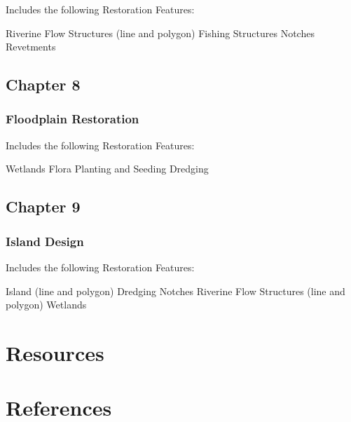\documentclass[
  letterpaper,
  DIV=11,
  numbers=noendperiod]{scrreprt}
\begin{document}
Includes the following Restoration Features:

Riverine Flow Structures (line and polygon) Fishing Structures Notches
Revetments

\section{Chapter 8}\label{chapter-8}

\subsection{Floodplain Restoration}\label{floodplain-restoration-1}

Includes the following Restoration Features:

Wetlands Flora Planting and Seeding Dredging

\section{Chapter 9}\label{chapter-9}

\subsection{Island Design}\label{island-design}

Includes the following Restoration Features:

Island (line and polygon) Dredging Notches Riverine Flow Structures
(line and polygon) Wetlands


\chapter*{Resources}\label{resources}



\chapter*{References}\label{references}


\protect{}\label{refs}
\end{document}

